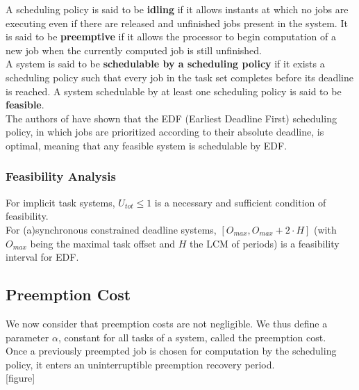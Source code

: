 \documentclass[a4paper,10pt]{article}
\begin{document}
        A scheduling policy is said to be \textbf{idling} if it allows instants at which no jobs are executing even if there are released and unfinished jobs present in the system. It is said to be \textbf{preemptive} if it allows the processor to begin computation of a new job when the currently computed job is still unfinished.\\

        A system is said to be \textbf{schedulable by a scheduling policy} if it exists a scheduling policy such that every job in the task set completes before its deadline is reached. A system schedulable by at least one scheduling policy is said to be \textbf{feasible}.\\

        The authors of \cite{liu1973scheduling} have shown that the EDF (Earliest Deadline First) scheduling policy, in which jobs are prioritized according to their absolute deadline, is optimal, meaning that any feasible system is schedulable by EDF.\\

        \subsubsection{Feasibility Analysis}

        For implicit task systems, $U_{tot} \leqslant 1$ is a necessary and sufficient condition of feasibility.\\

        For (a)synchronous constrained deadline systems, $[O_{max}, O_{max} + 2 \cdot H]$ (with $O_{max}$ being the maximal task offset and $H$ the LCM of periods) is a feasibility interval for EDF.

    \subsection{Preemption Cost}

        We now consider that preemption costs are not negligible. We thus define a parameter $\alpha$, constant for all tasks of a system, called the preemption cost.\\

        Once a previously preempted job is chosen for computation by the scheduling policy, it enters an uninterruptible preemption recovery period.\\

        [figure]\\
\end{document}
